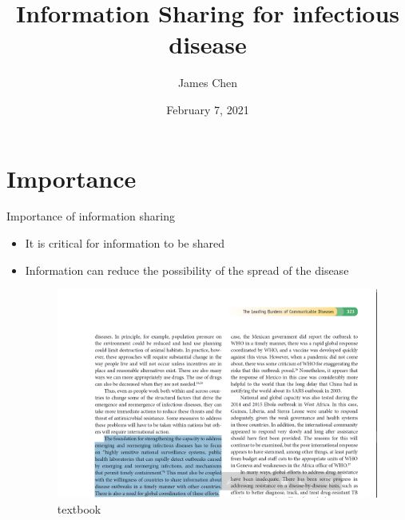 \documentclass{beamer}
\title[Information Sharing for infectious disease]{Information Sharing for infectious disease}
\author{James Chen}
\institute{NYU Shanghai}
\date{February 7, 2021}
\begin{document}
\begin{frame}
  \titlepage
\end{frame}


\section{Importance}
\begin{frame}{Importance of information sharing}
\begin{itemize}

  \item It is critical for information to be shared 
  \item Information can reduce the possibility of the spread of the disease 
  
\begin{figure}[H]
\centering
\includegraphics[scale=0.375]{textbook.png}
\caption{textbook}
\end{figure}
\cite{skolnik_2015}
\end{itemize}

\end{frame}
\end{document}
